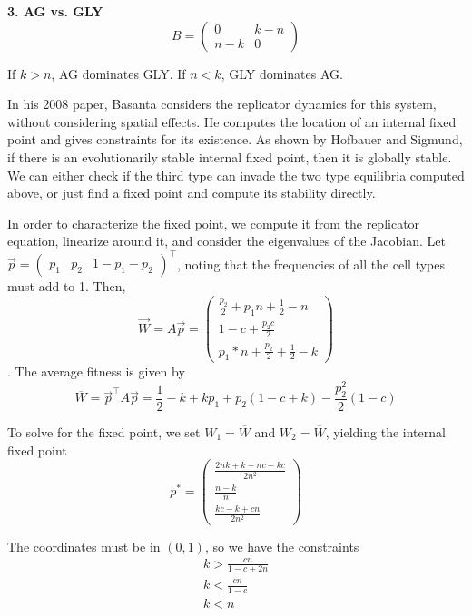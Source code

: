 \documentclass[12pt]{report}
\begin{document}
 \textbf{3. AG vs. GLY}
$$B = \begin{pmatrix}
0 & k -n\\
n -k & 0 
\end{pmatrix} $$

If $k > n$, AG dominates GLY. If $n < k$, GLY dominates AG. 

In his 2008 paper, Basanta considers the replicator dynamics for this system, without considering spatial effects. He computes the location of an internal fixed point and gives constraints for its existence. As shown by Hofbauer and Sigmund, if there is an evolutionarily stable internal fixed point, then it is globally stable. We can either check if the third type can invade the two type equilibria computed above, or just find a fixed point and compute its stability directly.

In order to characterize the fixed point, we compute it from the replicator equation, linearize around it, and consider the eigenvalues of the Jacobian.
Let $\vec{p} = { \begin{pmatrix} p_1 & p_2 & 1-p_1-p_2 \end{pmatrix}}^\top$, noting that the frequencies of all the cell types must add to 1. Then, $$\vec{W} = A\vec{p} = 
{\begin{pmatrix} \frac{p_2}{2} + p_1 n + \frac{1}{2}-n\\
1-c + \frac{p_2 c}{2}\\ %
p_1*n+\frac{p_2}{2} + \frac{1}{2}-k \end{pmatrix}}$$. The average fitness is given by  $$\overline{W} = \vec{p}^\top A \vec{p} = \frac{1}{2}-k+ k p_1 + p_2 (1 - c + k) - \frac{p_2^2}{2} (1-c) $$

To solve for the fixed point, we set $W_1 = \overline{W}$ and $W_2 = \overline{W}$, yielding the internal fixed point 
$$p^* = {\begin{pmatrix}\displaystyle{\frac{2 n k + k - n c - k c}{2n^2}}\\
		\displaystyle{\frac{n-k}{n}}\\
		\displaystyle{\frac{k c - k + c n}{2n^2}}
		\end{pmatrix}}$$

The coordinates must be in $(0,1)$, so we have the constraints
\begin{gather}
k > \frac{cn}{1 - c + 2n}\\
k < \frac{cn}{1-c} \\
k < n
\end{gather}
\end{document}
